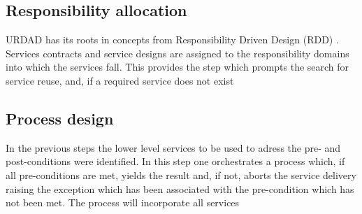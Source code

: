 \subsection{Responsibility allocation}

URDAD has its roots in concepts from Responsibility Driven Design (RDD) \cite{wirfs-brock_object-oriented_1989,wirfs-brock_object_2002}. Services contracts and service designs are assigned to the responsibility domains into which the services fall. This provides the step which prompts the search for service reuse, and, if a required service does not exist

\subsection{Process design}
In the previous steps the lower level services to be used to adress the pre- and post-conditions were identified. In this step one orchestrates a process which, if all pre-conditions are met, yields the result and, if not, aborts the service delivery raising the exception which has been associated with the pre-condition which has not been met. The process will incorporate all services







